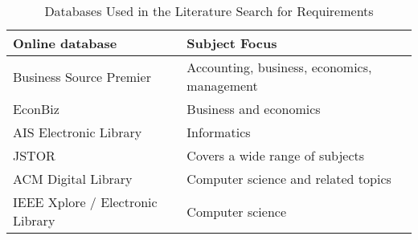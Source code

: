 

\vspace{2cm}
\begin{table}[htbp]
    \centering
    \small
    \begin{tabular}{lL{8cm}}
    \hline
    Online database           & Subject Focus                                                          \\ \hline
    Business Source Premier   & Accounting, business, economics, management                            \\
    EconBiz                   & Business and economics                                                 \\
    AIS Electronic Library    & Informatics                                                            \\
    JSTOR & Covers a wide range of subjects \\
    ACM Digital Library & Computer science and related topics \\
    IEEE Xplore / Electronic Library & Computer science \\ \hline
    \end{tabular}
    \caption{Databases Used in the Literature Search for Requirements}
    \label{literature_search_db}
    \end{table}

